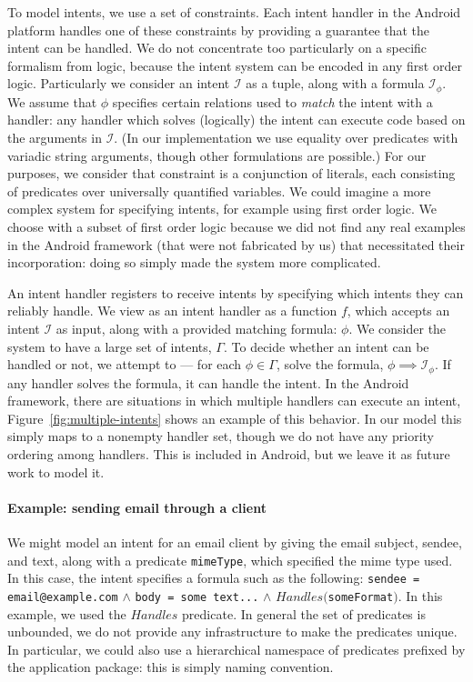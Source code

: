 \documentclass{acm_proc_article-sp}
\begin{document}
To model intents, we use a set of constraints.  Each intent handler in
the Android platform handles one of these constraints by providing a
guarantee that the intent can be handled.  We do not concentrate too
particularly on a specific formalism from logic, because the intent
system can be encoded in any first order logic.  Particularly we
consider an intent $\mathcal{I}$ as a tuple, along with a formula
$\mathcal{I}_\phi$.  We assume that $\phi$ specifies certain relations
used to \emph{match} the intent with a handler: any handler which
solves (logically) the intent can execute code based on the arguments
in $\mathcal{I}$.  (In our implementation we use equality over
predicates with variadic string arguments, though other formulations
are possible.)  For our purposes, we consider that constraint is a
conjunction of literals, each consisting of predicates over
universally quantified variables.  We could imagine a more complex
system for specifying intents, for example using first order logic.
We choose with a subset of first order logic because we did not find
any real examples in the Android framework (that were not fabricated
by us) that necessitated their incorporation: doing so simply made the
system more complicated.

An intent handler registers to receive intents by specifying which
intents they can reliably handle.  We view as an intent handler as a
function $f$, which accepts an intent $\mathcal{I}$ as input, along
with a provided matching formula: $\phi$.  We consider the system to
have a large set of intents, $\Gamma$.  To decide whether an intent
can be handled or not, we attempt to --- for each $\phi \in \Gamma$,
solve the formula, $\phi \implies \mathcal{I}_\phi$.  If any handler
solves the formula, it can handle the intent.  In the Android
framework, there are situations in which multiple handlers can execute
an intent, Figure~\ref{fig:multiple-intents} shows an example of this
behavior.  In our model this simply maps to a nonempty handler set,
though we do not have any priority ordering among handlers.  This is
included in Android, but we leave it as future work to model it.

\paragraph*{Example: sending email through a client} 
We might model an intent for an email client by giving the email
subject, sendee, and text, along with a predicate \texttt{mimeType},
which specified the mime type used.  In this case, the intent
specifies a formula such as the following: \texttt{sendee =
  email@example.com} $\land$ \texttt{body = some text...} $\land$
$Handles($\texttt{someFormat}$)$.  In this example, we used the
$Handles$ predicate.  In general the set of predicates is unbounded,
we do not provide any infrastructure to make the predicates unique.
In particular, we could also use a hierarchical namespace of
predicates prefixed by the application package: this is simply naming
convention.
\end{document}
